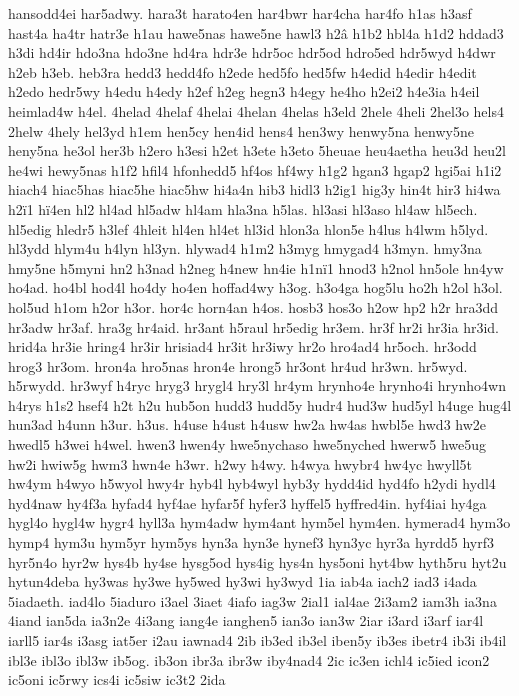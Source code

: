 {hansodd4ei
har5adwy.
hara3t
harato4en
har4bwr
har4cha
har4fo
h1as
h3asf
hast4a
ha4tr
hatr3e
h1au
hawe5nas
hawe5ne
hawl3
h2^^e2
h1b2
hbl4a
h1d2
hddad3
h3di
hd4ir
hdo3na
hdo3ne
hd4ra
hdr3e
hdr5oc
hdr5od
hdro5ed
hdr5wyd
h4dwr
h2eb
h3eb.
heb3ra
hedd3
hedd4fo
h2ede
hed5fo
hed5fw
h4edid
h4edir
h4edit
h2edo
hedr5wy
h4edu
h4edy
h2ef
h2eg
hegn3
h4egy
he4ho
h2ei2
h4e3ia
h4eil
heimlad4w
h4el.
4helad
4helaf
4helai
4helan
4helas
h3eld
2hele
4heli
2hel3o
hels4
2helw
4hely
hel3yd
h1em
hen5cy
hen4id
hens4
hen3wy
henwy5na
henwy5ne
heny5na
he3ol
her3b
h2ero
h3esi
h2et
h3ete
h3eto
5heuae
heu4aetha
heu3d
heu2l
he4wi
hewy5nas
h1f2
hfil4
hfonhedd5
hf4os
hf4wy
h1g2
hgan3
hgap2
hgi5ai
h1i2
hiach4
hiac5has
hiac5he
hiac5hw
hi4a4n
hib3
hidl3
h2ig1
hig3y
hin4t
hir3
hi4wa
h2^^ef1
h^^ef4en
hl2
hl4ad
hl5adw
hl4am
hla3na
h5las.
hl3asi
hl3aso
hl4aw
hl5ech.
hl5edig
hledr5
h3lef
4hleit
hl4en
hl4et
hl3id
hlon3a
hlon5e
h4lus
h4lwm
h5lyd.
hl3ydd
hlym4u
h4lyn
hl3yn.
hlywad4
h1m2
h3myg
hmygad4
h3myn.
hmy3na
hmy5ne
h5myni
hn2
h3nad
h2neg
h4new
hn4ie
h1n^^ef1
hnod3
h2nol
hn5ole
hn4yw
ho4ad.
ho4bl
hod4l
ho4dy
ho4en
hoffad4wy
h3og.
h3o4ga
hog5lu
ho2h
h2ol
h3ol.
hol5ud
h1om
h2or
h3or.
hor4c
horn4an
h4os.
hosb3
hos3o
h2ow
hp2
h2r
hra3dd
hr3adw
hr3af.
hra3g
hr4aid.
hr3ant
h5raul
hr5edig
hr3em.
hr3f
hr2i
hr3ia
hr3id.
hrid4a
hr3ie
hring4
hr3ir
hrisiad4
hr3it
hr3iwy
hr2o
hro4ad4
hr5och.
hr3odd
hrog3
hr3om.
hron4a
hro5nas
hron4e
hrong5
hr3ont
hr4ud
hr3wn.
hr5wyd.
h5rwydd.
hr3wyf
h4ryc
hryg3
hrygl4
hry3l
hr4ym
hrynho4e
hrynho4i
hrynho4wn
h4rys
h1s2
hsef4
h2t
h2u
hub5on
hudd3
hudd5y
hudr4
hud3w
hud5yl
h4uge
hug4l
hun3ad
h4unn
h3ur.
h3us.
h4use
h4ust
h4usw
hw2a
hw4as
hwbl5e
hwd3
hw2e
hwedl5
h3wei
h4wel.
hwen3
hwen4y
hwe5nychaso
hwe5nyched
hwerw5
hwe5ug
hw2i
hwiw5g
hwm3
hwn4e
h3wr.
h2wy
h4wy.
h4wya
hwybr4
hw4yc
hwyll5t
hw4ym
h4wyo
h5wyol
hwy4r
hyb4l
hyb4wyl
hyb3y
hydd4id
hyd4fo
h2ydi
hydl4
hyd4naw
hy4f3a
hyfad4
hyf4ae
hyfar5f
hyfer3
hyffel5
hyffred4in.
hyf4iai
hy4ga
hygl4o
hygl4w
hygr4
hyll3a
hym4adw
hym4ant
hym5el
hym4en.
hymerad4
hym3o
hymp4
hym3u
hym5yr
hym5ys
hyn3a
hyn3e
hynef3
hyn3yc
hyr3a
hyrdd5
hyrf3
hyr5n4o
hyr2w
hys4b
hy4se
hysg5od
hys4ig
hys4n
hys5oni
hyt4bw
hyth5ru
hyt2u
hytun4deba
hy3was
hy3we
hy5wed
hy3wi
hy3wyd
1ia
iab4a
iach2
iad3
i4ada
5iadaeth.
iad4lo
5iaduro
i3ael
3iaet
4iafo
iag3w
2ial1
ial4ae
2i3am2
iam3h
ia3na
4iand
ian5da
ia3n2e
4i3ang
iang4e
ianghen5
ian3o
ian3w
2iar
i3ard
i3arf
iar4l
iarll5
iar4s
i3asg
iat5er
i2au
iawnad4
2ib
ib3ed
ib3el
iben5y
ib3es
ibetr4
ib3i
ib4il
ibl3e
ibl3o
ibl3w
ib5og.
ib3on
ibr3a
ibr3w
iby4nad4
2ic
ic3en
ichl4
ic5ied
icon2
ic5oni
ic5rwy
ics4i
ic5siw
ic3t2
2ida
}
